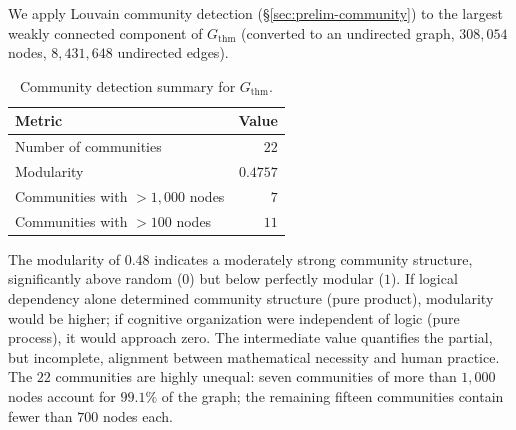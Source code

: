 We apply Louvain community detection (\S\ref{sec:prelim-community}) to the largest weakly connected component of $G_{\mathrm{thm}}$ (converted to an undirected graph, $308{,}054$ nodes, $8{,}431{,}648$ undirected edges).

\begin{table}[ht]
\centering
\caption{Community detection summary for $G_{\mathrm{thm}}$.}
\label{tab:thm-community-summary}
\begin{tabular}{lr}
\toprule
Metric & Value \\
\midrule
Number of communities & $22$ \\
Modularity & $0.4757$ \\
Communities with ${>}1{,}000$ nodes & $7$ \\
Communities with ${>}100$ nodes & $11$ \\
\bottomrule
\end{tabular}
\end{table}

The modularity of $0.48$ indicates a moderately strong community structure, significantly above random ($0$) but below perfectly modular ($1$). If logical dependency alone determined community structure (pure product), modularity would be higher; if cognitive organization were independent of logic (pure process), it would approach zero. The intermediate value quantifies the partial, but incomplete, alignment between mathematical necessity and human practice. The $22$ communities are highly unequal: seven communities of more than $1{,}000$ nodes account for $99.1\%$ of the graph; the remaining fifteen communities contain fewer than $700$ nodes each.

